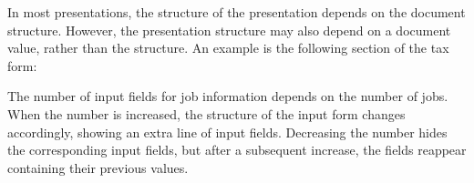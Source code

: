 
In most presentations, the structure of the presentation depends on the document structure. However, the presentation structure may also depend on a document value, rather than the structure. An example is the following section of the tax form:


The number of input fields for job information depends on the number of jobs. When the number is increased, the structure of the input form changes accordingly, showing an extra line of input fields. Decreasing the number hides the corresponding input fields, but after a subsequent increase, the fields reappear containing their previous values.

